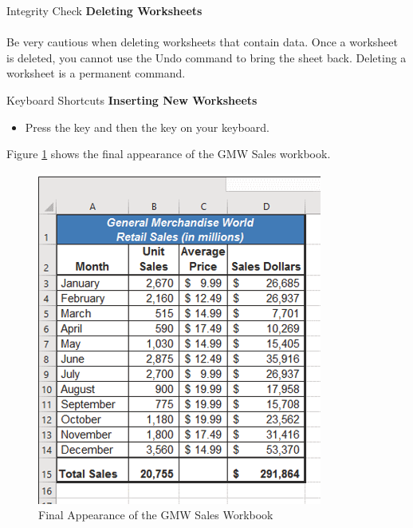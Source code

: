 \begin{center}
	\begin{infobox}{Integrity Check}
		\textbf{Deleting Worksheets}
		\\
		\\
		Be very cautious when deleting worksheets that contain data. Once a worksheet is deleted, you cannot use the Undo command to bring the sheet back. Deleting a worksheet is a permanent command.
	\end{infobox}
\end{center}

\begin{center}
	\begin{shtcutbox}{Keyboard Shortcuts}
		\textbf{Inserting New Worksheets}
		\\
		\begin{itemize}
			\setlength{\itemsep}{0pt}
			\setlength{\parskip}{0pt}
			\setlength{\parsep}{0pt}
			
			\item Press the  key and then the  key on your keyboard.
			
		\end{itemize}
	\end{shtcutbox}
\end{center}


Figure \ref{01:fig48} shows the final appearance of the GMW Sales workbook.

\begin{figure}[H]
	\centering
	\includegraphics[width=\maxwidth{.95\linewidth}]{gfx/ch01_fig48}
	\caption{Final Appearance of the GMW Sales Workbook}
	\label{01:fig48}
\end{figure}

